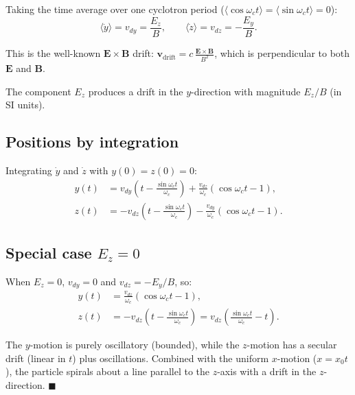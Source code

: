 \documentclass[12pt]{article}
\newcommand{\vect}[1]{\mathbf{#1}}
\begin{document}
Taking the time average over one cyclotron period ($\langle\cos\omega_c t\rangle = \langle\sin\omega_c t\rangle = 0$):
\[
\boxed{\langle\dot{y}\rangle = v_{dy} = \frac{E_z}{B}}, \qquad \langle\dot{z}\rangle = v_{dz} = -\frac{E_y}{B}.
\]

This is the well-known $\vect{E}\times\vect{B}$ drift: $\vect{v}_{\text{drift}} = c\,\frac{\vect{E}\times\vect{B}}{B^2}$, which is perpendicular to both $\vect{E}$ and $\vect{B}$.

The component $E_z$ produces a drift in the $y$-direction with magnitude $E_z/B$ (in SI units).

\subsection*{Positions by integration}

Integrating $\dot{y}$ and $\dot{z}$ with $y(0)=z(0)=0$:
\begin{align}
y(t) &= v_{dy}\!\left(t - \frac{\sin\omega_c t}{\omega_c}\right) + \frac{v_{dz}}{\omega_c}(\cos\omega_c t - 1), \\
z(t) &= -v_{dz}\!\left(t - \frac{\sin\omega_c t}{\omega_c}\right) - \frac{v_{dy}}{\omega_c}(\cos\omega_c t - 1).
\end{align}

\subsection*{Special case $E_z = 0$}

When $E_z = 0$, $v_{dy} = 0$ and $v_{dz} = -E_y/B$, so:
\begin{align}
y(t) &= \frac{v_{dz}}{\omega_c}(\cos\omega_c t - 1), \\
z(t) &= -v_{dz}\!\left(t - \frac{\sin\omega_c t}{\omega_c}\right) = v_{dz}\!\left(\frac{\sin\omega_c t}{\omega_c} - t\right).
\end{align}

The $y$-motion is purely oscillatory (bounded), while the $z$-motion has a secular drift (linear in $t$) plus oscillations. Combined with the uniform $x$-motion ($x = x_0 t$), the particle spirals about a line parallel to the $z$-axis with a drift in the $z$-direction. \hfill $\blacksquare$
\end{document}
